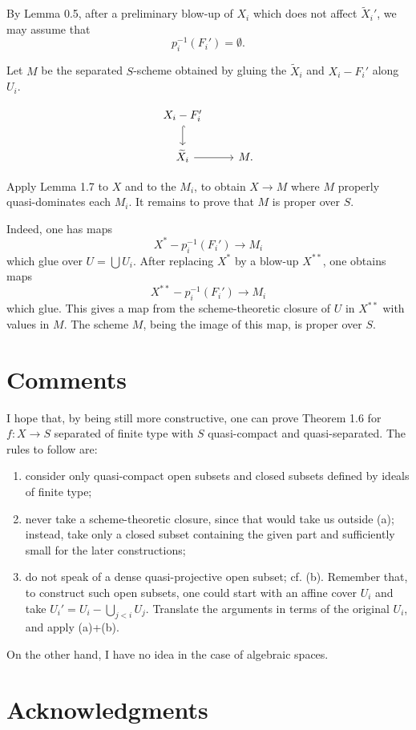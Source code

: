 \documentclass[11pt,a4paper]{article}
\theoremstyle{plain}
\theoremstyle{definition}
\begin{document}
By Lemma 0.5, after a preliminary blow-up of $X_i$ which does not affect $\widetilde X_i'$, we may assume that
\[
p_i^{-1}(F_i')=\emptyset.
\]

Let $M$ be the separated $S$-scheme obtained by gluing the $\widetilde X_i$ and $X_i-F_i'$ along $U_i$.

\[
\begin{tikzcd}
X_i-F_i' \arrow[d,hook] \\
\widetilde X_i \arrow[r] & M .
\end{tikzcd}
\]

Apply Lemma 1.7 to $X$ and to the $M_i$, to obtain $X\to M$ where $M$ properly quasi-dominates each $M_i$. It remains to prove that $M$ is proper over $S$.

Indeed, one has maps
\[
X^*-p_i^{-1}(F_i')\to M_i
\]
which glue over $U=\bigcup U_i$. After replacing $X^*$ by a blow-up $X^{**}$, one obtains maps
\[
X^{**}-p_i^{-1}(F_i')\to M_i
\]
which glue. This gives a map from the scheme-theoretic closure of $U$ in $X^{**}$ with values in $M$. The scheme $M$, being the image of this map, is proper over $S$.

\section*{Comments}

I hope that, by being still more constructive, one can prove Theorem 1.6 for $f:X\to S$ separated of finite type with $S$ quasi-compact and quasi-separated. The rules to follow are:
\begin{enumerate}[label=(\alph*)]
\item consider only quasi-compact open subsets and closed subsets defined by ideals of finite type;
\item never take a scheme-theoretic closure, since that would take us outside (a); instead, take only a closed subset containing the given part and sufficiently small for the later constructions;
\item do not speak of a dense quasi-projective open subset; cf. (b). Remember that, to construct such open subsets, one could start with an affine cover $U_i$ and take $U_i'=U_i-\bigcup_{j<i}U_j$. Translate the arguments in terms of the original $U_i$, and apply (a)+(b).
\end{enumerate}

On the other hand, I have no idea in the case of algebraic spaces.

\section*{Acknowledgments}
\end{document}
